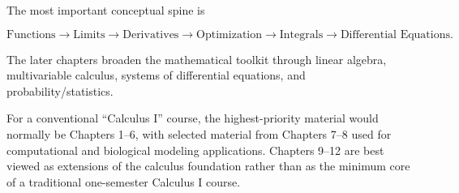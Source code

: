 \documentclass[11pt]{article}
\begin{document}
The most important conceptual spine is

\[
\boxed{
\text{Functions}
\rightarrow
\text{Limits}
\rightarrow
\text{Derivatives}
\rightarrow
\text{Optimization}
\rightarrow
\text{Integrals}
\rightarrow
\text{Differential Equations}.
}
\]

The later chapters broaden the mathematical toolkit through linear
algebra, multivariable calculus, systems of differential equations,
and probability/statistics.

For a conventional ``Calculus I'' course, the highest-priority
material would normally be Chapters 1--6, with selected material
from Chapters 7--8 used for computational and biological modeling
applications. Chapters 9--12 are best viewed as extensions of the
calculus foundation rather than as the minimum core of a traditional
one-semester Calculus I course.
\end{document}

